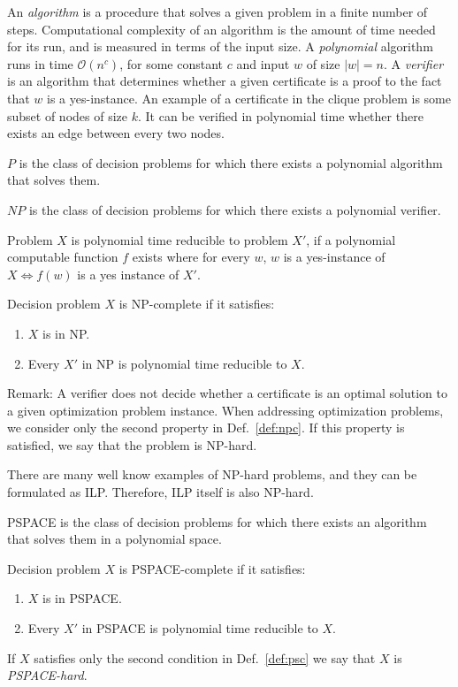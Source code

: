 An \emph{algorithm} is a procedure that solves a given problem in a finite number of steps.
Computational complexity of an algorithm is the amount of time needed for its run, and is measured in terms of the input size.
A \emph{polynomial} algorithm runs in time $\mathcal{O}(n^c)$, for some constant $c$ and input $w$ of size $|w|=n$.
A \emph{verifier} is an algorithm that determines whether a given certificate is a proof to the fact that $w$ is a yes-instance.
An example of a certificate in the clique problem is some subset of nodes of size $k$.
It can be verified in polynomial time whether there exists an edge between every two nodes.
\begin{definition}
	$P$ is the class of decision problems for which there exists a polynomial algorithm that solves them.
\end{definition}
\begin{definition}
	$NP$ is the class of decision problems for which there exists a polynomial verifier. 
\end{definition}
\begin{definition}
	Problem $X$ is polynomial time reducible to problem $X'$, if a polynomial computable function $f$ exists where for every $w$, 
	$w$ is a yes-instance of $X\Leftrightarrow f(w)$ is a yes instance of $X'$.
\end{definition}
\begin{definition}\label{def:npc}
	Decision problem $X$ is NP-complete if it satisfies:
	\begin{enumerate}
		\item $X$ is in NP.
		\item Every $X'$ in NP is polynomial time reducible to $X$.
	\end{enumerate}
\end{definition}
Remark:
A verifier does not decide whether a certificate is an optimal solution to a given optimization problem instance. 
When addressing optimization problems, we consider only the second property in Def.~\ref{def:npc}. 
If this property is satisfied, we say that the problem is NP-hard.

There are many well know examples of NP-hard problems, and they can be formulated as ILP.
Therefore, ILP itself is also NP-hard.

\begin{definition}
	PSPACE is the class of decision problems for which there exists an algorithm that solves them in a polynomial space.
\end{definition}
\begin{definition}\label{def:psc}
	Decision problem $X$ is PSPACE-complete if it satisfies:
	\begin{enumerate}
		\item $X$ is in PSPACE.
		\item Every $X'$ in PSPACE is polynomial time reducible to $X$.
	\end{enumerate}
\end{definition}
If $X$ satisfies only the second condition in Def.~\ref{def:psc} we say that $X$ is \emph{PSPACE-hard}.


